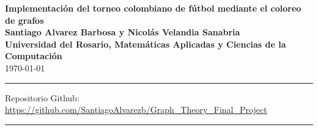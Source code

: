 \documentclass[11pt]{article}
\begin{document}
    \begin{center}
        \huge{\textbf{Implementación del torneo colombiano de fútbol mediante el coloreo de grafos}}\\[10pt]
        \small{\textbf{Santiago Alvarez Barbosa y Nicolás Velandia Sanabria}}\\[10pt]
        \small{\textbf{Universidad del Rosario, Matemáticas Aplicadas y Ciencias de la Computación}}\\[10pt]
        \today\\
        \rule{\textwidth}{0.5pt}
                Repositorio Github: \url{https://github.com/SantiagoAlvarezb/Graph_Theory_Final_Project}
        \rule{\textwidth}{0.5pt}
    \end{center}
\end{document}
